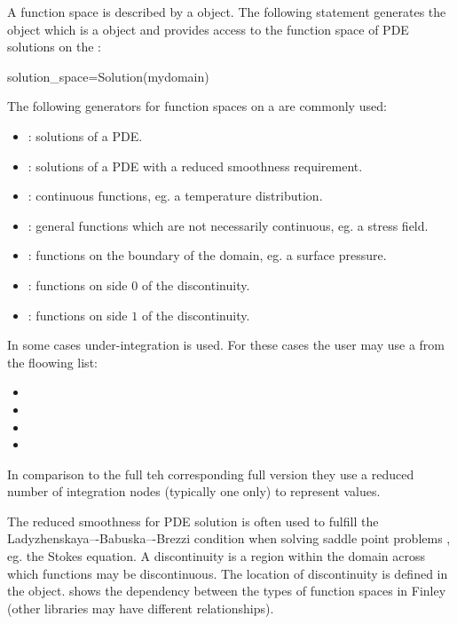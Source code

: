 A function space is described by a \FunctionSpace object.  The
following statement generates the object  which is
a \FunctionSpace object and provides access to the function space of
PDE solutions on the \Domain {}:

\begin{python}
  solution_space=Solution(mydomain)
\end{python}
The following generators for function spaces on a \Domain {} are commonly used: 
\begin{itemize}
\item {}: solutions of a PDE.
\item {}: solutions of a PDE with a reduced smoothness requirement.  
\item {}: continuous functions, eg. a temperature distribution.
\item {}: general functions which are not necessarily continuous, eg. a stress field.
\item {}: functions on the boundary of the domain, eg. a surface pressure.
\item {}: functions on side $0$ of the discontinuity. 
\item {}: functions on side $1$ of the discontinuity.
\end{itemize}
In some cases under-integration is used. For these cases the user may use a
\FunctionSpace from the floowing list:
\begin{itemize}
\item {}
\item {}
\item {} 
\item {}
\end{itemize}
In comparison to the full teh corresponding full version
they use a reduced number of integration nodes (typically one only) to represent values.


The reduced smoothness for PDE solution is often used to fulfill the Ladyzhenskaya–-Babuska–-Brezzi condition \cite{LBB} when 
solving saddle point problems , eg. the Stokes equation.
A discontinuity  is a region within the domain across which functions may be discontinuous.  
The location of discontinuity is defined in the \Domain object.
 shows the dependency between the types of function spaces in Finley (other libraries may have different relationships).

